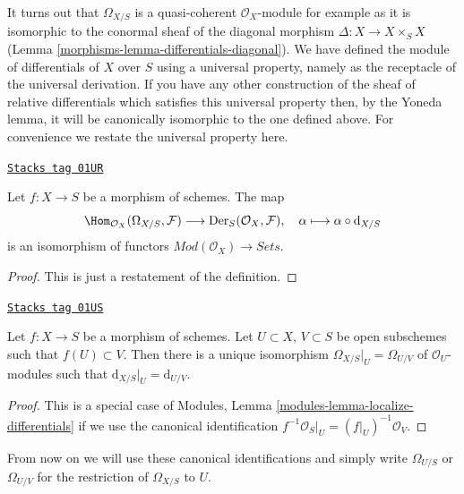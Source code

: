 It turns out that $\Omega_{X/S}$ is a quasi-coherent $\mathcal{O}_X$-module
for example as it is isomorphic to the conormal sheaf
of the diagonal morphism $\Delta : X \to X \times_S X$
(Lemma \ref{morphisms-lemma-differentials-diagonal}).
We have defined the module of differentials of $X$ over $S$ using a
universal property, namely as the receptacle of the universal derivation.
If you have any other construction of the sheaf of relative differentials
which satisfies this universal property then, by the Yoneda lemma,
it will be canonically isomorphic to the one defined above. For convenience
we restate the universal property here.

\begin{lemma}
\label{morphisms-lemma-universal-derivation-universal}
\href{https://stacks.math.columbia.edu/tag/01UR}{\texttt{Stacks tag 01UR}}

Let $f : X \to S$ be a morphism of schemes. The map
$$
\Hom_{\mathcal{O}_X}(\Omega_{X/S}, \mathcal{F})
\longrightarrow
\text{Der}_S(\mathcal{O}_X, \mathcal{F}),\quad
\alpha \longmapsto \alpha \circ \text{d}_{X/S}
$$
is an isomorphism of functors $\textit{Mod}(\mathcal{O}_X) \to \textit{Sets}$.
\end{lemma}

\begin{proof}
This is just a restatement of the definition.
\end{proof}

\begin{lemma}
\label{morphisms-lemma-differentials-restrict-open}
\href{https://stacks.math.columbia.edu/tag/01US}{\texttt{Stacks tag 01US}}

Let $f : X \to S$ be a morphism of schemes.
Let $U \subset X$, $V \subset S$ be open subschemes such
that $f(U) \subset V$. Then there is a unique isomorphism
$\Omega_{X/S}|_U = \Omega_{U/V}$ of $\mathcal{O}_U$-modules such that
$\text{d}_{X/S}|_U = \text{d}_{U/V}$.
\end{lemma}

\begin{proof}
This is a special case of
Modules, Lemma \ref{modules-lemma-localize-differentials}
if we use the canonical identification
$f^{-1}\mathcal{O}_S|_U = (f|_U)^{-1}\mathcal{O}_V$.
\end{proof}

From now on we will use these canonical identifications and simply
write $\Omega_{U/S}$ or $\Omega_{U/V}$ for the restriction of
$\Omega_{X/S}$ to $U$.

